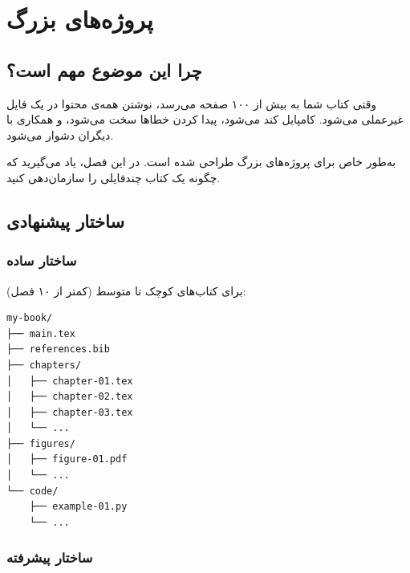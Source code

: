 
\chapter{پروژه‌های بزرگ}
\label{chap:large-projects}

\section{چرا این موضوع مهم است؟}
\label{sec:large-projects-why}

وقتی کتاب شما به بیش از ۱۰۰ صفحه می‌رسد،
نوشتن همه‌ی محتوا در یک فایل 
غیرعملی می‌شود. کامپایل کند می‌شود، پیدا
کردن خطاها سخت می‌شود، و همکاری با دیگران
دشوار می‌شود.

 به‌طور خاص برای پروژه‌های بزرگ
طراحی شده است. در این فصل، یاد می‌گیرید که
چگونه یک کتاب چندفایلی را سازمان‌دهی کنید.


\section{ساختار پیشنهادی}
\label{sec:large-projects-structure}

\subsection{ساختار ساده}
\label{sec:large-projects-simple}

برای کتاب‌های کوچک تا متوسط (کمتر از ۱۰
فصل):

\begin{latin}
\begin{verbatim}
my-book/
├── main.tex
├── references.bib
├── chapters/
│   ├── chapter-01.tex
│   ├── chapter-02.tex
│   ├── chapter-03.tex
│   └── ...
├── figures/
│   ├── figure-01.pdf
│   └── ...
└── code/
    ├── example-01.py
    └── ...
\end{verbatim}
\end{latin}


\subsection{ساختار پیشرفته}
\label{sec:large-projects-advanced}

